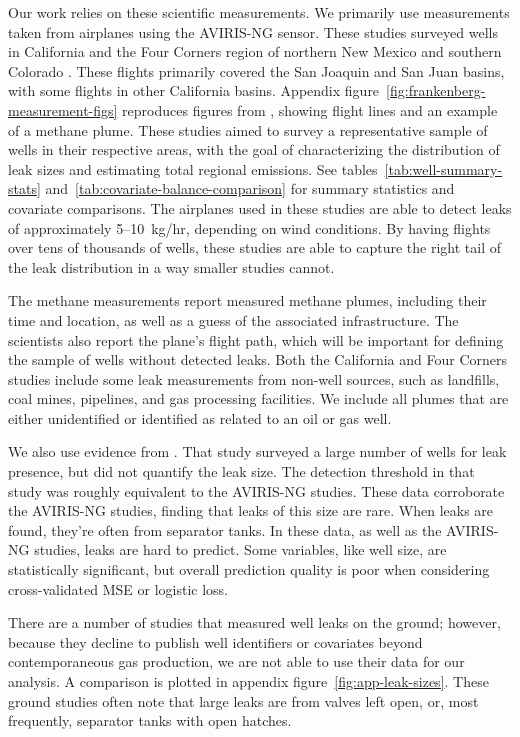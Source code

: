 \documentclass[12pt,oneside,letterpaper]{article}
\theoremstyle{definition}
\begin{document}
\begin{refsection}
Our work relies on these scientific measurements.
We primarily use measurements taken from airplanes using the \gls{AVIRIS-NG} sensor.
These studies surveyed wells in California and the Four Corners region of northern New Mexico and southern Colorado
\parencite{Duren/etal:2019, Frankenberg/etal:2016}.
These flights primarily covered the San Joaquin and San Juan basins, with some flights in other California basins.
Appendix figure~\ref{fig:frankenberg-measurement-figs} reproduces figures from \textcite{Frankenberg/etal:2016}, showing flight lines and an example of a methane plume.
These studies aimed to survey a representative sample of wells in their respective areas, with the goal of characterizing the distribution of leak sizes and estimating total regional emissions.
See tables~\ref{tab:well-summary-stats} and~\ref{tab:covariate-balance-comparison} for summary statistics and covariate comparisons.
The airplanes used in these studies are able to detect leaks of approximately 5--10~kg/hr, depending on wind conditions.
By having flights over tens of thousands of wells, these studies are able to capture the right tail of the leak distribution in a way smaller studies cannot.

The methane measurements report measured methane plumes, including their time and location, as well as a guess of the associated infrastructure.
The scientists also report the plane's flight path, which will be important for defining the sample of wells without detected leaks.
Both the California and Four Corners studies include some leak measurements from non-well sources, such as landfills, coal mines, pipelines, and gas processing facilities.
We include all plumes that are either unidentified or identified as related to an oil or gas well.



We also use evidence from \textcite{Lyon/Alvarez/Zavala-Araiza/Brandt/Jackson/Hamburg:2016}.
That study surveyed a large number of wells for leak presence, but did not quantify the leak size.
The detection threshold in that study was roughly equivalent to the \gls{AVIRIS-NG} studies.
These data corroborate the \gls{AVIRIS-NG} studies, finding that leaks of this size are rare.
When leaks are found, they're often from separator tanks.
In these data, as well as the \gls{AVIRIS-NG} studies, leaks are hard to predict.
Some variables, like well size, are statistically significant, but overall prediction quality is poor when considering cross-validated \gls{MSE} or logistic loss.

There are a number of studies that measured well leaks on the ground;
however, because they decline to publish well identifiers or covariates beyond contemporaneous gas production, we are not able to use their data for our analysis.
A comparison is plotted in appendix figure~\ref{fig:app-leak-sizes}.
These ground studies often note that large leaks are from valves left open, or, most frequently, separator tanks with open hatches.



\end{refsection}
\end{document}
